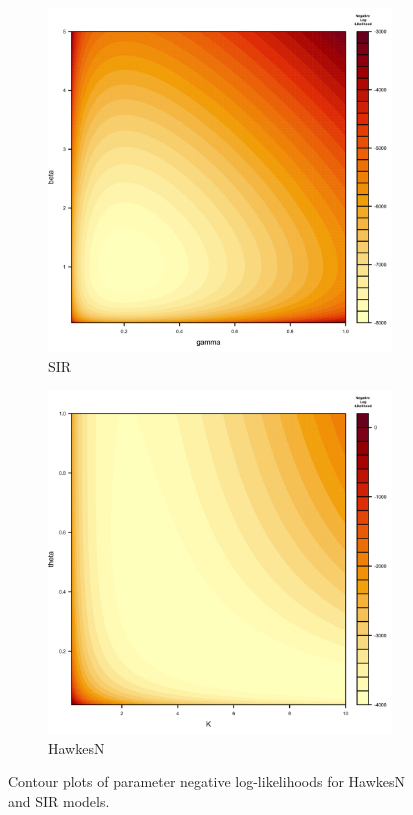 \documentclass[12pt]{article}
\begin{document}
\begin{figure}
\centering
\begin{subfigure}{.5\textwidth}
  \centering
  \includegraphics[width=1\linewidth]{../figures/SIR_contour-plot_gamma_beta.png}
  \caption{SIR}
\end{subfigure}%
\begin{subfigure}{.5\textwidth}
  \centering
  \includegraphics[width=1\linewidth]{../figures/HawkesN_contour-plot_K_theta.png}
  \caption{HawkesN}
\end{subfigure}
\caption{Contour plots of parameter negative log-likelihoods for HawkesN and SIR models. }
\label{fig:contour}
\end{figure}
\end{document}
